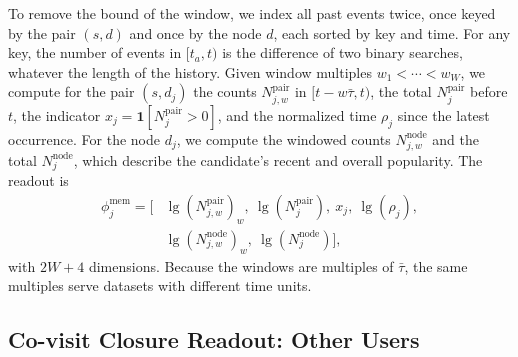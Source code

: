 \documentclass[twoside]{article}
\newcommand{\lone}{\operatorname{lg}}
\begin{document}
To remove the bound of the window, we index all past events twice, once keyed by the pair $(s,d)$ and once by the node $d$, each sorted by key and time. For any key, the number of events in $[t_a,t)$ is the difference of two binary searches, whatever the length of the history. Given window multiples $w_1<\cdots<w_W$, we compute for the pair $(s,d_j)$ the counts $N^{\mathrm{pair}}_{j,w}$ in $[t-w\bar{\tau},t)$, the total $N^{\mathrm{pair}}_j$ before $t$, the indicator $x_j=\mathbf{1}[N^{\mathrm{pair}}_j>0]$, and the normalized time $\rho_j$ since the latest occurrence. For the node $d_j$, we compute the windowed counts $N^{\mathrm{node}}_{j,w}$ and the total $N^{\mathrm{node}}_j$, which describe the candidate's recent and overall popularity. The readout is
\begin{equation}
\begin{aligned}
\phi^{\mathrm{mem}}_j=\big[&\lone(N^{\mathrm{pair}}_{j,w})_{w},\ \lone(N^{\mathrm{pair}}_j),\ x_j,\ \lone(\rho_j),\\
&\lone(N^{\mathrm{node}}_{j,w})_{w},\ \lone(N^{\mathrm{node}}_j)\big],
\end{aligned}
\end{equation}
with $2W+4$ dimensions. Because the windows are multiples of $\bar{\tau}$, the same multiples serve datasets with different time units.

\subsection{Co-visit Closure Readout: Other Users}
\label{sec:covisit}
\end{document}
